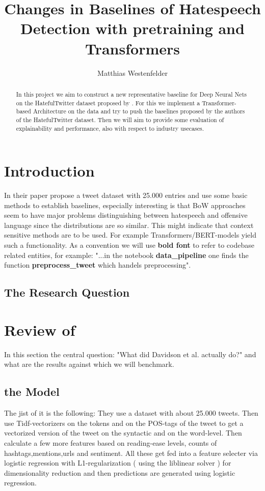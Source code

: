 \documentclass[11pt,a4paper]{article}
\title{Changes in Baselines of Hatespeech Detection with pretraining and Transformers}
\author{Matthias Westenfelder}
\begin{document}
\maketitle
\tableofcontents
\begin{abstract}
In this project we aim to construct a new representative baseline for Deep Neural Nets on the HatefulTwitter dataset proposed by \cite{auto_hatespeech}.
For this we implement a Transformer-based Architecture on the data and try to push the baselines proposed by the authors of the HatefulTwitter dataset.
Then we will aim to provide some evaluation of explainability and performance, also with respect to industry usecases.
\end{abstract}
 

\section{Introduction}
In their paper \cite{auto_hatespeech} propose a tweet dataset with 25.000 entries and use some basic methods to establish baselines,
especially interesting is that BoW approaches seem to have major problems distinguishing between hatespeech and offensive language since the distributions are so similar.
This might indicate that context sensitive methods are to be used. For example Transformers/BERT-models yield such a functionality.
As a convention we will use \textbf{bold font} to refer to codebase related entities, for example: 
"...in the notebook \textbf{data\_pipeline} one finds the function \textbf{preprocess\_tweet} which handels preprocessing".

\subsection{The Research Question}

\section{Review of \cite{auto_hatespeech}}
In this section the central question: "What did Davidson et al. actually do?" and what are the results against which we will benchmark.

\subsection{the Model}
The jist of it is the following:
They use a dataset with about 25.000 tweets. 
Then use Tidf-vectorizers on the tokens and on the POS-tags of the tweet to get a vectorized 
version of the tweet on the syntactic and on the word-level.
Then calculate a few more features based on reading-ease levels, counts of hashtags,mentions,urls and sentiment.
All these get fed into a feature selecter via logistic regression with L1-regularization ( using the liblinear solver )
for dimensionality reduction and then predictions are generated using logistic regression.
\end{document}
